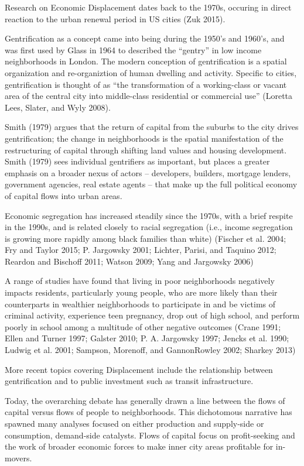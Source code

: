 \documentclass[]{article}
\begin{document}
Research on Economic Displacement dates back to the 1970s, occuring in
direct reaction to the urban renewal period in US cities (Zuk 2015).

Gentrification as a concept came into being during the 1950's and
1960's, and was first used by Glass in 1964 to described the ``gentry''
in low income neighborhoods in London. The modern conception of
gentrification is a spatial organization and re-organiztion of human
dwelling and activity. Specific to cities, gentrification is thought of
as ``the transformation of a working-class or vacant area of the central
city into middle-class residential or commercial use'' (Loretta Lees,
Slater, and Wyly 2008).

Smith (1979) argues that the return of capital from the suburbs to the
city drives gentrification; the change in neighborhoods is the spatial
manifestation of the restructuring of capital through shifting land
values and housing development. Smith (1979) sees individual gentrifiers
as important, but places a greater emphasis on a broader nexus of actors
-- developers, builders, mortgage lenders, government agencies, real
estate agents -- that make up the full political economy of capital
flows into urban areas.

Economic segregation has increased steadily since the 1970s, with a
brief respite in the 1990s, and is related closely to racial segregation
(i.e., income segregation is growing more rapidly among black families
than white) (Fischer et al. 2004; Fry and Taylor 2015; P. Jargowsky
2001; Lichter, Parisi, and Taquino 2012; Reardon and Bischoff 2011;
Watson 2009; Yang and Jargowsky 2006)

A range of studies have found that living in poor neighborhoods
negatively impacts residents, particularly young people, who are more
likely than their counterparts in wealthier neighborhoods to participate
in and be victims of criminal activity, experience teen pregnancy, drop
out of high school, and perform poorly in school among a multitude of
other negative outcomes (Crane 1991; Ellen and Turner 1997; Galster
2010; P. A. Jargowsky 1997; Jencks et al. 1990; Ludwig et al. 2001;
Sampson, Morenoff, and GannonRowley 2002; Sharkey 2013)

More recent topics covering Displacement include the relationship
between gentrification and to public investment such as transit
infrastructure.

Today, the overarching debate has generally drawn a line between the
flows of capital versus flows of people to neighborhoods. This
dichotomous narrative has spawned many analyses focused on either
production and supply-side or consumption, demand-side catalysts. Flows
of capital focus on profit-seeking and the work of broader economic
forces to make inner city areas profitable for in-movers.
\end{document}
